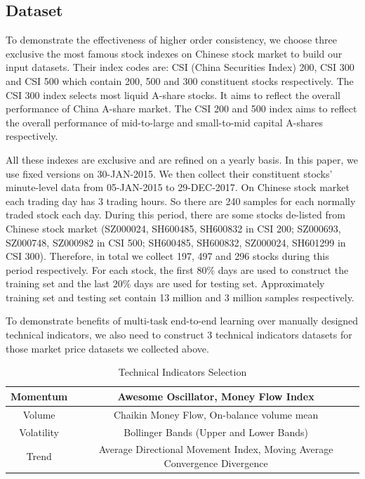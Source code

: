 \documentclass[sigconf, anonymous, review]{acmart}
\begin{document}
\subsection{Dataset}
\label{sec:dataset}

To demonstrate the effectiveness of higher order consistency, we
choose three exclusive the most famous stock indexes on Chinese
stock market to build our input datasets. Their index codes are:
CSI (China Securities Index) 200, CSI 300 and CSI 500 which
contain 200, 500 and 300 constituent stocks respectively. The CSI
300 index selects most liquid A-share stocks. It aims to reflect
the overall performance of China A-share market. The CSI 200 and
500 index aims to reflect the overall performance of mid-to-large
and small-to-mid capital A-shares respectively.

All these indexes are exclusive and are refined on a yearly
basis. In this paper, we use fixed versions on 30-JAN-2015. We
then collect their constituent stocks' minute-level data from
05-JAN-2015 to 29-DEC-2017. On Chinese stock market each trading
day has 3 trading hours. So there are 240 samples for each
normally traded stock each day. During this period, there are
some stocks de-listed from Chinese stock market (SZ000024,
SH600485, SH600832 in CSI 200; SZ000693, SZ000748, SZ000982 in
CSI 500; SH600485, SH600832, SZ000024, SH601299 in CSI 300).
Therefore, in total we collect 197, 497 and 296 stocks during
this period respectively. For each stock, the first $80\%$ days
are used to construct the training set and the last $20\%$ days
are used for testing set. Approximately training set and testing
set contain 13 million and 3 million samples respectively.

To demonstrate benefits of multi-task end-to-end learning over
manually designed technical indicators, we also need to construct
3 technical indicators datasets for those market price datasets
we collected above.
\begin{table}
  \label{tab:ta}
\centering
\caption{Technical Indicators Selection}
\begin{tabular}{|c|c|} \hline
  Momentum& Awesome Oscillator, Money Flow Index\\ \hline
  Volume& Chaikin Money Flow, On-balance volume mean\\ \hline
  Volatility& Bollinger Bands (Upper and Lower Bands)\\ \hline
  Trend& Average Directional Movement Index, Moving Average Convergence Divergence\\ \hline
\end{tabular}
\end{table}




\newcommand{\newblock}{}



\end{document}
